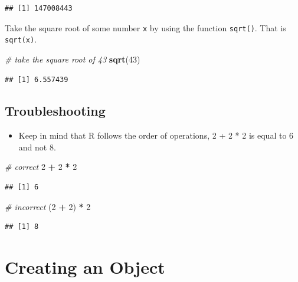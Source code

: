 \documentclass[
]{book}
\newenvironment{Shaded}{\begin{snugshade}}{\end{snugshade}}
\newcommand{\CommentTok}[1]{\textcolor[rgb]{0.56,0.35,0.01}{\textit{#1}}}
\newcommand{\DecValTok}[1]{\textcolor[rgb]{0.00,0.00,0.81}{#1}}
\newcommand{\FunctionTok}[1]{\textcolor[rgb]{0.13,0.29,0.53}{\textbf{#1}}}
\newcommand{\NormalTok}[1]{#1}
\newcommand{\SpecialCharTok}[1]{\textcolor[rgb]{0.81,0.36,0.00}{\textbf{#1}}}
\providecommand{\tightlist}{%
  \setlength{\itemsep}{0pt}\setlength{\parskip}{0pt}}
\begin{document}
\begin{verbatim}
## [1] 147008443
\end{verbatim}

Take the square root of some number \texttt{x} by using the function \texttt{sqrt()}. That is \texttt{sqrt(x)}.

\begin{Shaded}
\begin{Highlighting}[]
\CommentTok{\# take the square root of 43}
\FunctionTok{sqrt}\NormalTok{(}\DecValTok{43}\NormalTok{)}
\end{Highlighting}
\end{Shaded}

\begin{verbatim}
## [1] 6.557439
\end{verbatim}

\hypertarget{troubleshooting}{%
\subsection{Troubleshooting}\label{troubleshooting}}

\begin{itemize}
\tightlist
\item
  Keep in mind that R follows the order of operations, 2 + 2 * 2 is equal to 6 and not 8.
\end{itemize}

\begin{Shaded}
\begin{Highlighting}[]
\CommentTok{\# correct}
\DecValTok{2} \SpecialCharTok{+} \DecValTok{2} \SpecialCharTok{*} \DecValTok{2}
\end{Highlighting}
\end{Shaded}

\begin{verbatim}
## [1] 6
\end{verbatim}

\begin{Shaded}
\begin{Highlighting}[]
\CommentTok{\# incorrect}
\NormalTok{(}\DecValTok{2} \SpecialCharTok{+} \DecValTok{2}\NormalTok{) }\SpecialCharTok{*} \DecValTok{2}
\end{Highlighting}
\end{Shaded}

\begin{verbatim}
## [1] 8
\end{verbatim}

\hypertarget{object}{%
\section{Creating an Object}\label{object}}
\end{document}
